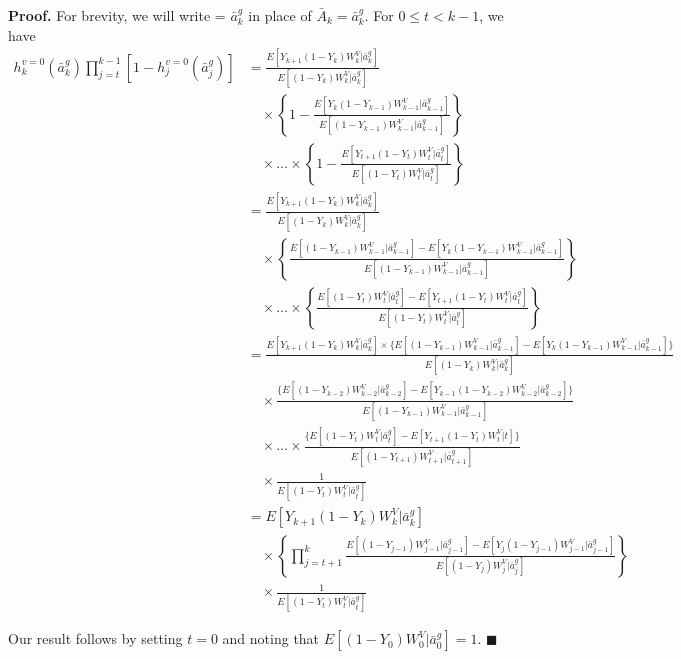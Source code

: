 \textbf{Proof.} For brevity, we will write = $\bar{a}^g_k$ in place of $\bar{A}_k = \bar{a}^g_k$. For  $0 \leq t < k - 1$, we have
\begin{align}
h_k^{v=0}(\bar{a}^g_k) \prod_{j=t}^{k-1} [1 - h_j^{v=0}(\bar{a}^g_j)] &= \frac{E[Y_{k+1}(1 - Y_k)W_k^V|\bar{a}^g_k]}{E[(1 - Y_k)W_k^V|\bar{a}^g_k]} \nonumber\\
&\quad \times \left\{1 - \frac{E[Y_k(1 - Y_{k-1})W_{k-1}^V|\bar{a}^g_{k-1}]}{E[(1 - Y_{k-1})W_{k-1}^V|\bar{a}^g_{k-1}]}\right\} \nonumber\\
&\quad \times \ldots \times \left\{1 - \frac{E[Y_{t+1}(1 - Y_t)W_t^V|\bar{a}^g_t]}{E[(1 - Y_t)W_t^V|\bar{a}^g_t]}\right\} \nonumber\\
&= \frac{E[Y_{k+1}(1 - Y_k)W_k^V|\bar{a}^g_k]}{E[(1 - Y_k)W_k^V|\bar{a}^g_k]} \nonumber\\
&\quad \times \left\{\frac{E[(1 - Y_{k-1})W_{k-1}^V|\bar{a}^g_{k-1}] - E[Y_k(1 - Y_{k-1})W_{k-1}^V|\bar{a}^g_{k-1}]}{E[(1 - Y_{k-1})W_{k-1}^V|\bar{a}^g_{k-1}]}\right\} \nonumber\\
&\quad \times \ldots \times \left\{\frac{E[(1 - Y_t)W_t^V|\bar{a}^g_t] - E[Y_{t+1}(1 - Y_t)W_t^V|\bar{a}^g_t]}{E[(1 - Y_t)W_t^V|\bar{a}^g_t]}\right\} \nonumber\\
&= \frac{E[Y_{k+1}(1 - Y_k)W_k^V|\bar{a}^g_k] \times \{E[(1 - Y_{k-1})W_{k-1}^V|\bar{a}^g_{k-1}] - E[Y_k(1 - Y_{k-1})W_{k-1}^V|\bar{a}^g_{k-1}]\}}{E[(1 - Y_k)W_k^V|\bar{a}^g_k]} \nonumber\\
&\quad \times \frac{\{E[(1 - Y_{k-2})W_{k-2}^V|\bar{a}^g_{k-2}] - E[Y_{k-1}(1 - Y_{k-2})W_{k-2}^V|\bar{a}^g_{k-2}]\}}{E[(1 - Y_{k-1})W_{k-1}^V|\bar{a}^g_{k-1}]} \nonumber\\
&\quad \times \ldots \times \frac{\{E[(1 - Y_t)W_t^V|\bar{a}^g_t] - E[Y_{t+1}(1 - Y_t)W_t^V|t]\}}{E[(1 - Y_{t+1})W_{t+1}^V|\bar{a}^g_{t+1}]} \nonumber\\
&\quad \times \frac{1}{E[(1 - Y_t)W_t^V|\bar{a}^g_t]} \nonumber\\
&= E[Y_{k+1}(1 - Y_k)W_k^V|\bar{a}^g_k] \nonumber\\
&\quad \times \left\{\prod_{j=t+1}^k \frac{E[(1 - Y_{j-1})W_{j-1}^V|\bar{a}^g_{j-1}] - E[Y_j(1 - Y_{j-1})W_{j-1}^V|\bar{a}^g_{j-1}]}{E[(1 - Y_j)W_j^V|\bar{a}^g_j]}\right\} \nonumber\\
&\quad \times \frac{1}{E[(1 - Y_t)W_t^V|\bar{a}^g_t]}
\end{align}

Our result follows by setting $t = 0$ and noting that $E[(1 - Y_0)W_0^V|\bar{a}^g_0] = 1$. \(\blacksquare\)